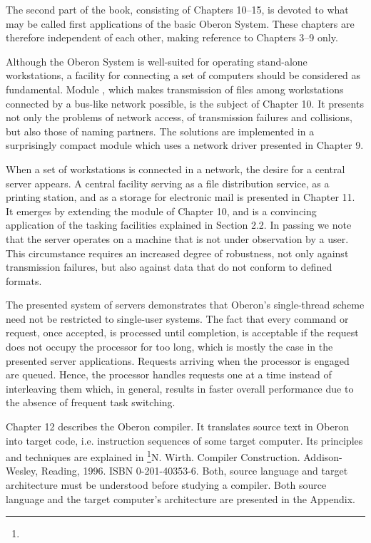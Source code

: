 The second part of the book, consisting of Chapters 10--15, is
devoted to what may be called first applications of the basic Oberon
System. These chapters are therefore independent of each other, making
reference to Chapters 3--9 only.

Although the Oberon System is well-suited for operating stand-alone
workstations, a facility for connecting a set of computers should be
considered as fundamental. Module , which makes transmission of
files among workstations connected by a bus-like network possible, is
the subject of Chapter 10. It presents not only the problems of
network access, of transmission failures and collisions, but also
those of naming partners. The solutions are implemented in a
surprisingly compact module which uses a network driver presented in
Chapter 9.

When a set of workstations is connected in a network, the desire for a
central server appears. A central facility serving as a file
distribution service, as a printing station, and as a storage for
electronic mail is presented in Chapter 11. It emerges by extending
the  module of Chapter 10, and is a convincing application of the
tasking facilities explained in Section 2.2. In passing we note that
the server operates on a machine that is not under observation by a
user. This circumstance requires an increased degree of robustness,
not only against transmission failures, but also against data that do
not conform to defined formats.

The presented system of servers demonstrates that Oberon's
single-thread scheme need not be restricted to single-user
systems. The fact that every command or request, once accepted, is
processed until completion, is acceptable if the request does not
occupy the processor for too long, which is mostly the case in the
presented server applications. Requests arriving when the processor is
engaged are queued. Hence, the processor handles requests one at a
time instead of interleaving them which, in general, results in faster
overall performance due to the absence of frequent task switching.

Chapter 12 describes the Oberon compiler. It translates source text in
Oberon into target code, i.e. instruction sequences of some target
computer. Its principles and techniques are explained in \footnote{{\mc[6]}}{N. Wirth. Compiler Construction. Addison-Wesley, Reading, 1996. ISBN 0-201-40353-6}. Both,
source language and target architecture must be understood before
studying a compiler. Both source language and the target computer's
\RISC architecture are presented in the Appendix.

